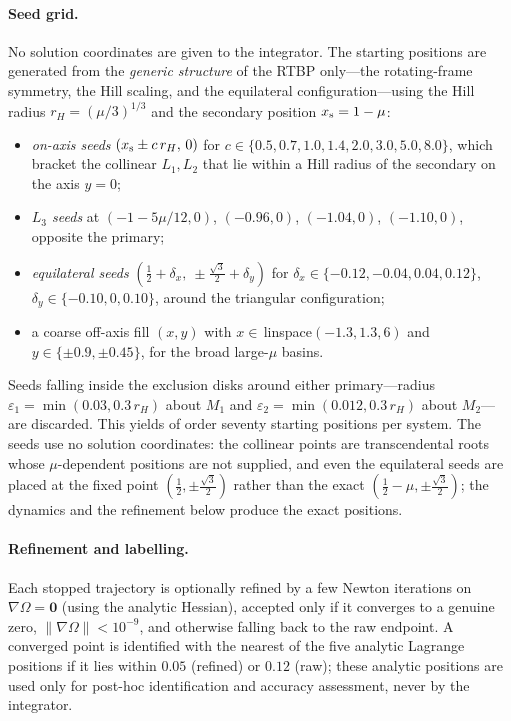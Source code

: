 \documentclass[aip,preprint,amsmath,amssymb,floatfix]{revtex4-2}
\begin{document}
\paragraph{Seed grid.}
No solution coordinates are given to the integrator. The starting positions are
generated from the \emph{generic structure} of the RTBP only---the rotating-frame
symmetry, the Hill scaling, and the equilateral configuration---using the Hill
radius $r_H=(\mu/3)^{1/3}$ and the secondary position $x_{\rm s}=1-\mu$:
\begin{itemize}
\item[(A)] \emph{on-axis seeds} $(x_{\rm s}\pm c\,r_H,\,0)$ for
  $c\in\{0.5,0.7,1.0,1.4,2.0,3.0,5.0,8.0\}$, which bracket the collinear $L_1,L_2$
  that lie within a Hill radius of the secondary on the axis $y=0$;
\item[(B)] \emph{$L_3$ seeds} at $(-1-5\mu/12,0)$, $(-0.96,0)$, $(-1.04,0)$,
  $(-1.10,0)$, opposite the primary;
\item[(C)] \emph{equilateral seeds} $(\tfrac12+\delta_x,\ \pm\tfrac{\sqrt3}{2}
  +\delta_y)$ for $\delta_x\in\{-0.12,-0.04,0.04,0.12\}$,
  $\delta_y\in\{-0.10,0,0.10\}$, around the triangular configuration;
\item[(D)] a coarse off-axis fill $(x,y)$ with $x\in\,$linspace$(-1.3,1.3,6)$ and
  $y\in\{\pm0.9,\pm0.45\}$, for the broad large-$\mu$ basins.
\end{itemize}
Seeds falling inside the exclusion disks around either primary---radius
$\varepsilon_1=\min(0.03,0.3\,r_H)$ about $M_1$ and
$\varepsilon_2=\min(0.012,0.3\,r_H)$ about $M_2$---are discarded. This yields of
order seventy starting positions per system. The seeds use no solution
coordinates: the collinear points are transcendental roots whose $\mu$-dependent
positions are not supplied, and even the equilateral seeds are placed at the
fixed point $(\tfrac12,\pm\tfrac{\sqrt3}{2})$ rather than the exact
$(\tfrac12-\mu,\pm\tfrac{\sqrt3}{2})$; the dynamics and the refinement below
produce the exact positions.

\paragraph{Refinement and labelling.}
Each stopped trajectory is optionally refined by a few Newton iterations on
$\nabla\Omega=\mathbf 0$ (using the analytic Hessian), accepted only if it
converges to a genuine zero, $\lVert\nabla\Omega\rVert<10^{-9}$, and otherwise
falling back to the raw endpoint. A converged point is identified with the
nearest of the five analytic Lagrange positions if it lies within $0.05$ (refined)
or $0.12$ (raw); these analytic positions are used only for post-hoc
identification and accuracy assessment, never by the integrator.
\end{document}
